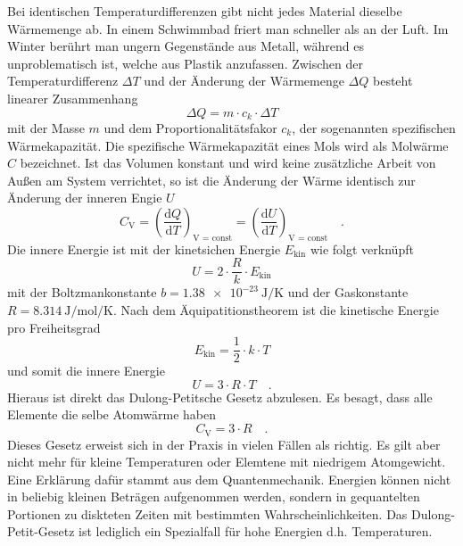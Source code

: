 Bei identischen Temperaturdifferenzen gibt nicht jedes Material dieselbe Wär\-me\-menge ab. In einem Schwimmbad friert man schneller als an der Luft. Im Winter berührt man ungern Gegenstände aus Metall, während es unproblematisch ist, welche aus Plastik anzufassen.
Zwischen der Temperaturdifferenz $\Delta T$ und der Änderung der Wärmemenge $\Delta Q$ besteht linearer Zusammenhang
\begin{equation}
  \Delta Q = m \cdot c_k \cdot \Delta T
\end{equation}
mit der Masse $m$ und dem Proportionalitätsfakor $c_k$, der sogenannten spezifischen Wärmekapazität.
Die spezifische Wärmekapazität eines Mols wird als Molwärme $C$ bezeichnet. Ist das Volumen konstant und wird keine zusätzliche Arbeit von Außen am System verrichtet, so ist die Änderung der Wärme identisch zur Änderung der inneren Engie $U$
\begin{equation}
  C_\text{V} = \left(\frac{\text{d} Q}{\text{d} T} \right)_\text{V = const}= \left(\frac{\text{d} U}{\text{d} T} \right)_\text{V = const} \quad.
\end{equation}
Die innere Energie ist mit der kinetsichen Energie $E_\text{kin}$ wie folgt verknüpft
\begin{equation}
  U = 2 \cdot \frac{R}{k} \cdot E_\text{kin}
\end{equation}
mit der Boltzmankonstante $b = \SI{1.38e-23}{\joule\per\kelvin}$ und der Gaskonstante $R = \SI{8.314}{\joule\per\mol\per\kelvin}$.
Nach dem Äquipatitionstheorem ist die kinetische Energie pro Freiheitsgrad
\begin{equation}
E_\text{kin}=\frac{1}{2}\cdot k \cdot T
\end{equation}
und somit die innere Energie
\begin{equation}
U = 3 \cdot R \cdot T \quad.
\end{equation}
Hieraus ist direkt das Dulong-Petitsche Gesetz abzulesen. Es besagt, dass alle Elemente die selbe Atomwärme haben
\begin{equation}\label{Dulon-Petit}
  C_\text{V} = 3 \cdot R \quad.
\end{equation}
Dieses Gesetz erweist sich in der Praxis in vielen Fällen als richtig. Es gilt aber nicht mehr für kleine Temperaturen oder Elemtene mit niedrigem Atomgewicht. Eine Erklärung dafür stammt aus dem Quantenmechanik. Energien können nicht in beliebig kleinen Beträgen aufgenommen werden, sondern in gequantelten Portionen zu diskteten Zeiten mit bestimmten Wahrscheinlichkeiten. Das Dulong-Petit-Gesetz ist lediglich ein Spezialfall für hohe Energien d.h. Temperaturen. \\
